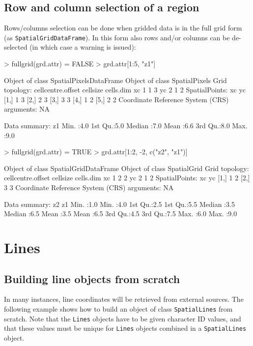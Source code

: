 \documentclass{article}
\begin{document}
\subsection{Row and column selection of a region}
Rows/columns selection can be done when gridded data is in the full grid
form (as {\tt SpatialGridDataFrame}). In this form also rows and/or columns
can be de-selected (in which case a warning is issued):
\begin{Schunk}
\begin{Sinput}
> fullgrid(grd.attr) = FALSE
> grd.attr[1:5, "z1"]
\end{Sinput}
\begin{Soutput}
Object of class SpatialPixelsDataFrame
Object of class SpatialPixels
Grid topology:
   cellcentre.offset cellsize cells.dim
xc                 1        1         3
yc                 2        1         2
SpatialPoints:
     xc yc
[1,]  1  3
[2,]  2  3
[3,]  3  3
[4,]  1  2
[5,]  2  2
Coordinate Reference System (CRS) arguments: NA 

Data summary:
       z1     
 Min.   :4.0  
 1st Qu.:5.0  
 Median :7.0  
 Mean   :6.6  
 3rd Qu.:8.0  
 Max.   :9.0  
\end{Soutput}
\begin{Sinput}
> fullgrid(grd.attr) = TRUE
> grd.attr[1:2, -2, c("z2", "z1")]
\end{Sinput}
\begin{Soutput}
Object of class SpatialGridDataFrame
Object of class SpatialGrid
Grid topology:
   cellcentre.offset cellsize cells.dim
xc                 1        2         2
yc                 2        1         2
SpatialPoints:
     xc yc
[1,]  1  2
[2,]  3  3
Coordinate Reference System (CRS) arguments: NA 

Data summary:
       z2            z1     
 Min.   :1.0   Min.   :4.0  
 1st Qu.:2.5   1st Qu.:5.5  
 Median :3.5   Median :6.5  
 Mean   :3.5   Mean   :6.5  
 3rd Qu.:4.5   3rd Qu.:7.5  
 Max.   :6.0   Max.   :9.0  
\end{Soutput}
\end{Schunk}

\section{Lines}

\subsection{Building line objects from scratch}
In many instances, line coordinates will be retrieved from external
sources.  The following example shows how to build an object of class
{\tt SpatialLines} from scratch. Note that the {\tt Lines} objects have to be given character ID values, and that these values must be unique for {\tt Lines} objects combined in a {\tt SpatialLines} object.
\end{document}
